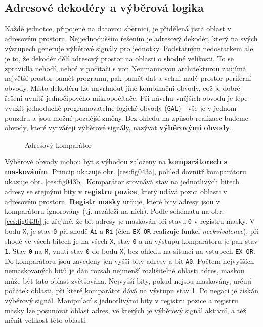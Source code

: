     \subsection{Adresové dekodéry a výběrová logika}
      Každé jednotce, připojené na datovou sběrnici, je přidělená jistá oblast v adresovém 
      prostoru. Nejjednodušším řešením je adresový dekodér, který na svých výstupech generuje 
      výběrové signály pro jednotky. Podstatným nedostatkem ale je to, že dekodér dělí adresový 
      prostor na oblasti o shodné velikosti. To se zpravidla nehodí, neboť v počítači s von 
      Neumannovou architekturou zaujímá největší prostor paměť programu, pak paměť dat a velmi malý 
      prostor periferní obvody. Místo dekodéru lze navrhnout jiné kombinační obvody, což je dobré 
      řešení uvnitř jednočipového mikropočítače. Při návrhu vnějších obvodů je lépe využít 
      jednoduché programovatelné logické obvody (\texttt{GAL}) - vše je v jednom pouzdru a jsou 
      možné pozdější změny. Bez ohledu na způsob realizace budeme obvody, které vytvářejí výběrové 
      signály, nazývat \textbf{výběrovými obvody}.
      
      \begin{figure}[ht!]
        \centering  
          {}              \newline
          {}              
        \caption{Adresový komparátor}\label{ces:fig043}
      \end{figure}
      
      Výběrové obvody mohou být s výhodou založeny na \textbf{komparátorech s maskováním}. Princip 
      ukazuje obr. \ref{ces:fig043a}, pohled dovnitř komparátoru ukazuje obr. 
      \ref{ces:fig043b}. Komparátor srovnává stav na jednotlivých bitech adresy se stejnými 
      bity v \textbf{registru pozice}, který udává pozici oblasti v adresovém prostoru. 
      \textbf{Registr masky} určuje, které bity adresy jsou v komparátoru ignorovány (tj. nezáleží 
      na nich). Podle schématu na obr. \ref{ces:fig043b} je zřejmé, že bit adresy je 
      maskován při stavu \texttt{0} v registru masky. V bodu \texttt{X}, je stav \texttt{0} při 
      shodě \texttt{Ai} a \texttt{Ri} (člen \texttt{EX-OR} realizuje funkci   
      \emph{neekvivalence}), při shodě ve všech bitech je na všech \texttt{X}, stav \texttt{0} a na 
      výstupu komparátoru je pak stav \texttt{1}. Stav \texttt{0} na \texttt{M}, vnutí stav 
      \texttt{0} do bodu \texttt{X}, bez ohledu na situaci na vstupech \texttt{EX-OR}. Do 
      komparátoru jsou zavedeny jen vyšší bity adresy a bit \texttt{A0}. Počtem nejvyšších 
      nemaskovaných bitů je dán rozsah nejmenší rozlišitelné oblasti adres, maskou může být tato 
      oblast zvětšována. Nejvyšší bity, pokud nejsou maskovány, určují počátek oblasti, při které 
      komparátor dává na výstupu stav 1. Po negaci je získán výběrový signál. Manipulací s 
      jednotlivými bity v registru pozice a registru masky lze posunovat oblast adres, ve 
      kterých je výběrový signál aktivní, a též měnit velikost této oblasti.
      
